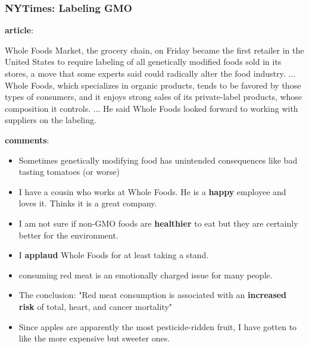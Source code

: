 \documentclass{tum-presentation}
\begin{document}
\begin{frame}
  \frametitle{NYTimes: Labeling GMO}
  \begin{description}
    \item \textbf{article}:
    \item Whole Foods Market, the grocery chain, on Friday became the first retailer in the United States to require labeling of all genetically modified foods sold in its stores, a move that some experts said could radically alter the food industry. ... Whole Foods, which specializes in organic products, tends to be favored by those types of consumers, and it enjoys strong sales of its private-label products, whose composition it controls. ... He said Whole Foods looked forward to working with suppliers on the labeling.
    \item \textbf{comments}:
    \item  \begin{itemize}
    \item Sometimes genetically modifying food has unintended consequences like bad tasting tomatoes (or worse)
    \item I have a cousin who works at Whole Foods. He is a \textbf{happy} employee and loves it. Thinks it is a great company.
    \item I am not sure if non-GMO foods are \textbf{healthier} to eat but they are certainly better for the environment.
    \item I \textbf{applaud} Whole Foods for at least taking a stand.
    \item consuming red meat is an emotionally charged issue for many people.
    \item The conclusion: "Red meat consumption is associated with an  \textbf{increased risk} of total, heart, and cancer mortality"
    \item Since apples are apparently the most pesticide-ridden fruit, I have gotten to like the more expensive but sweeter ones.
  \end{itemize}
   \end{description}
\end{frame}
\end{document}
